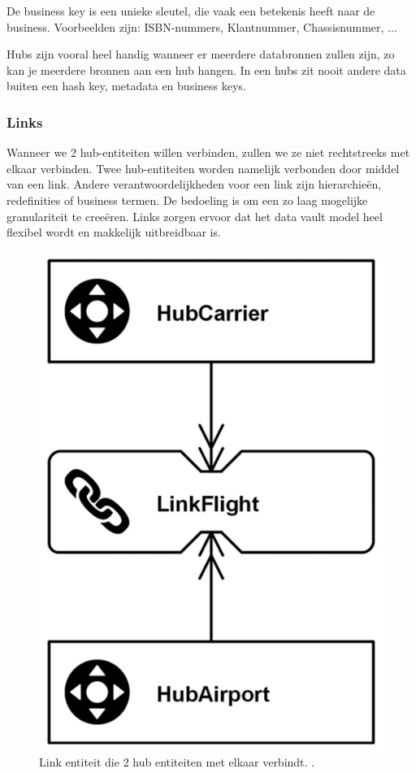  De business key is een unieke sleutel, die vaak een betekenis heeft naar de business. Voorbeelden zijn: ISBN-nummers, Klantnummer, Chassisnummer, ...
 
 Hubs zijn vooral heel handig wanneer er meerdere databronnen zullen zijn, zo kan je meerdere bronnen aan een hub hangen. In een hubs zit nooit andere data buiten een hash key, metadata en business keys.

\subsubsection{Links}
Wanneer we 2 hub-entiteiten willen verbinden, zullen we ze niet rechtstreeks met elkaar verbinden. Twee hub-entiteiten worden namelijk verbonden door middel van een link. Andere verantwoordelijkheden voor een link zijn hierarchieën, redefinities of business termen. De bedoeling is om een zo laag mogelijke granulariteit te creeëren. Links zorgen ervoor dat het data vault model heel flexibel wordt en makkelijk uitbreidbaar is. 

\begin{figure}[h]
	\centering
	\includegraphics[scale=0.3]{../images/link.png}
	\caption{Link entiteit die 2 hub entiteiten met elkaar verbindt. \autocite{Linstedt2016}.}
	\label{fig:link}
\end{figure}

